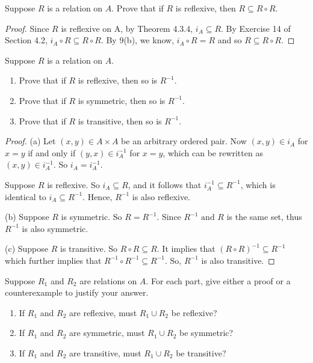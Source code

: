 \documentclass[12pt]{article}
\newenvironment{exercise}[2][Exercise]{\begin{trivlist}
\item[\hskip \labelsep {\bfseries #1}\hskip \labelsep {\bfseries #2.}]}{\end{trivlist}}
\newcommand{\nd}{\text{ and }}
\begin{document}
\begin{exercise}
	{11}
	Suppose \( R \) is a relation on \( A \). Prove that if \( R \) is reflexive, then \( R \subseteq R \circ R \).
\end{exercise}

\begin{proof}
	Since $R$ is reflexive on A, by Theorem 4.3.4, $i_A\subseteq R$. By Exercise 14 of Section 4.2, $i_A\circ R\subseteq R\circ R$. By 9(b), we know, $i_A\circ R=R$ and so $R\subseteq R\circ R$.   
\end{proof}

\begin{exercise}
	{12}
	Suppose \( R \) is a relation on \( A \).
	\begin{enumerate}
		\item[(a)] Prove that if \( R \) is reflexive, then so is \( R^{-1} \).
		\item[(b)] Prove that if \( R \) is symmetric, then so is \( R^{-1} \).
		\item[(c)] Prove that if \( R \) is transitive, then so is \( R^{-1} \).
	\end{enumerate}
\end{exercise}

\begin{proof}
	(a) Let $(x,y)\in A\times A$ be an arbitrary ordered pair. Now $(x,y)\in i_A$ for $x=y$ if and only if $(y,x)\in i_{A}^{-1}$ for $x=y$, which can be rewritten as $(x,y)\in i_{A}^{-1}$. So $i_{A} =i_{A}^{-1}$.
	
	Suppose $R$ is reflexive. So $i_{A} \subseteq R$, and it follows that $i_{A} ^{-1}\subseteq R^{-1}$, which is identical to $i_{A} \subseteq R^{-1}$. Hence, $R^{-1}$ is also reflexive.
	
	(b) Suppose $R$ is symmetric. So $R=R^{-1}$. Since $R^{-1} \nd R$ is the same set, thus $R^{-1}$ is also symmetric.
	
	(c) Suppose $R$ is transitive. So $R\circ R\subseteq R$. It implies that $(R\circ R)^{-1} \subseteq R^{-1}$ which further implies that $R^{-1} \circ R^{-1} \subseteq R^{-1}$. So, $R^{-1} $ is also transitive.
\end{proof}

\begin{exercise}
	{13}
	Suppose \( R_1 \) and \( R_2 \) are relations on \( A \). For each part, give either a proof or a counterexample to justify your answer.
	\begin{enumerate}
		\item[(a)] If \( R_1 \) and \( R_2 \) are reflexive, must \( R_1 \cup R_2 \) be reflexive?
		\item[(b)] If \( R_1 \) and \( R_2 \) are symmetric, must \( R_1 \cup R_2 \) be symmetric?
		\item[(c)] If \( R_1 \) and \( R_2 \) are transitive, must \( R_1 \cup R_2 \) be transitive?
	\end{enumerate}
\end{exercise}
\end{document}
